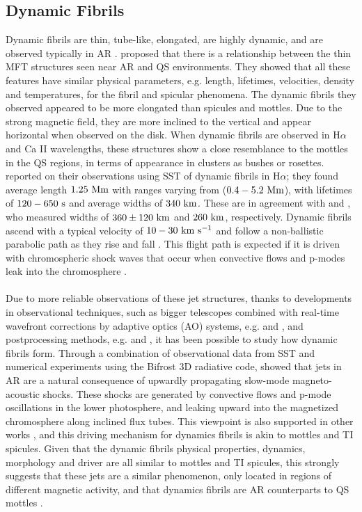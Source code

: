 \documentclass[12pt]{ociamthesis}
\newcommand{\kms}{~\rm{km ~s^{-1}}}
\newcommand{\np}{\\ \\}
\begin{document}
\subsection{Dynamic Fibrils}
\label{subsec:dfibs}
Dynamic fibrils are thin, tube-like, elongated, are highly dynamic, and are observed typically in AR \citep{De_Pontieu2007ApJ,Hansteen2006ApJ}. \cite{Foukal1971SoPh1959F,Foukal1971SoPh20298F} proposed that there is a relationship between the thin MFT structures seen near AR and QS environments. They showed that all these features have similar physical parameters, e.g. length, lifetimes, velocities, density and temperatures, for the fibril and spicular phenomena. The dynamic fibrils they observed appeared to be more elongated than spicules and mottles. Due to the strong magnetic field, they are more inclined to the vertical and appear horizontal when observed on the disk. When dynamic fibrils are observed in H$\alpha$ and Ca II wavelengths, these structures show a close resemblance to the mottles in the QS regions, in terms of appearance in clusters as bushes or rosettes. \cite{De_Pontieu2007ApJ} reported on their observations using SST of dynamic fibrils in H$\alpha$; they found average length $1.25~\rm{Mm}$ with ranges varying from ($0.4-5.2~\rm{Mm}$), with lifetimes of $120-650~\rm{s}$ and average widths of $340~\rm{km}$. These are in agreement with \cite{Morton2012NatCo31315M} and \cite{Gafeira2017ApJS2297G}, who measured widths of $360\pm120~\rm{km}$ and $260~\rm{km}$, respectively. Dynamic fibrils ascend with a typical velocity of $10-30\kms$ and follow a non-ballistic parabolic path as they rise and fall \cite{Beckers1968}. This flight path is expected if it is driven with chromospheric shock waves that occur when convective flows and p-modes leak into the chromosphere \citep{Langangen2008ApJ6731194L,De_Pontieu2007ApJ}. \np
%
Due to more reliable observations of these jet structures, thanks to developments in observational techniques, such as bigger telescopes combined with real-time wavefront corrections by adaptive optics (AO) systems, e.g. \cite{Scharmer2003SPIE4853370S} and \cite{Rimmele2000SPIE4007218R}, and postprocessing methods, e.g. \cite{van2005SoPh228191V} and \cite{von1993AA268374V}, it has been possible to study how dynamic fibrils form. Through a combination of observational data from SST and numerical experiments using the Bifrost 3D radiative code, \cite{Hansteen2006ApJ} showed that jets in AR are a natural consequence of upwardly propagating slow-mode magneto-acoustic shocks. These shocks are generated by convective flows and p-mode oscillations in the lower photosphere, and leaking upward into the magnetized chromosphere along inclined flux tubes. This viewpoint is also supported in other works \citep{Heggland2007ApJ6661277H,De_Pontieu2007ApJ,Pontieu2004Natur,Suematsu1990LNP367211S}, and this driving mechanism for dynamics fibrils is akin to mottles and TI spicules. Given that the dynamic fibrils physical properties, dynamics, morphology and driver are all similar to mottles and TI spicules, this strongly suggests that these jets are a similar phenomenon, only located in regions of different magnetic activity, and that dynamics fibrils are AR counterparts to QS mottles \citep{Rouppe2007ApJ660L169R}.
\end{document}
